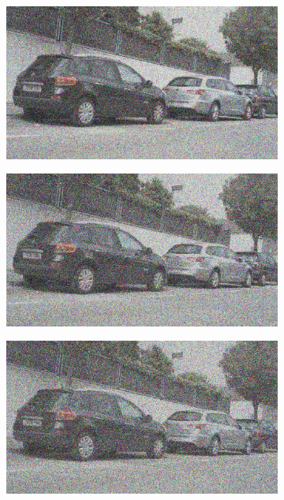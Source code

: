 \documentclass[a4paper]{ctexart}
\begin{document}
\begin{figure}[htbp]
\begin{subfigure}{0.08\textwidth}
				\label{fig：Gamma=0.9, Gauss Noise = 0.4}
			\end{subfigure}
			\begin{subfigure}{0.08\textwidth}
				\captionsetup{font=scriptsize}
				\includegraphics[width=\linewidth]{picture/Edge Detection/degrade/RGB_001 Gamma=0.9, Gauss Noise=0.5}
				\label{fig：Gamma=0.9, Gauss Noise = 0.5}
			\end{subfigure}
			\begin{subfigure}{0.08\textwidth}
				\captionsetup{font=scriptsize}
				\includegraphics[width=\linewidth]{picture/Edge Detection/degrade/RGB_001 Gamma=0.9, Gauss Noise=0.6}
				\label{fig：Gamma=0.9, Gauss Noise = 0.6}
			\end{subfigure}
			\begin{subfigure}{0.08\textwidth}
				\captionsetup{font=scriptsize}
				\includegraphics[width=\linewidth]{picture/Edge Detection/degrade/RGB_001 Gamma=0.9, Gauss Noise=0.7}

\end{subfigure}
\end{figure}
\end{document}
